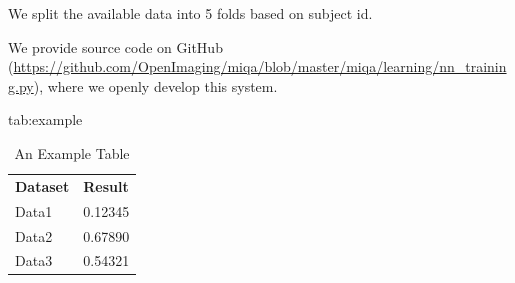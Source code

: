 \documentclass{midl} %
\begin{document}
We split the available data into 5 folds based on subject id.

We provide source code on GitHub (\url{https://github.com/OpenImaging/miqa/blob/master/miqa/learning/nn_training.py}), where we openly develop this system.


\begin{table}[htbp]
\floatconts
  {tab:example}%
  {\caption{An Example Table}}%
  {\begin{tabular}{ll}
  \bfseries Dataset & \bfseries Result\\
  Data1 & 0.12345\\
  Data2 & 0.67890\\
  Data3 & 0.54321
  \end{tabular}}
\end{table}




\end{document}

